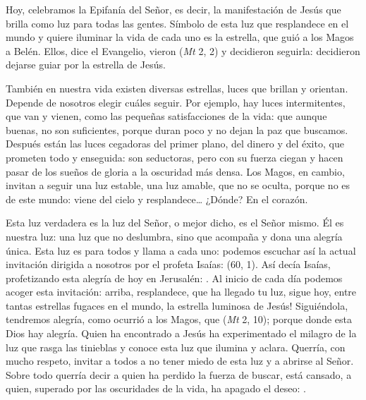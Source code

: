 Hoy, celebramos la Epifanía del Señor, es decir, la manifestación de Jesús que brilla como luz para todas las gentes. Símbolo de esta luz que resplandece en el mundo y quiere iluminar la vida de cada uno es la estrella, que guió a los Magos a Belén. Ellos, dice el Evangelio, vieron  (\emph{Mt} 2, 2) y decidieron seguirla: decidieron dejarse guiar por la estrella de Jesús.

También en nuestra vida existen diversas estrellas, luces que brillan y orientan. Depende de nosotros elegir cuáles seguir. Por ejemplo, hay luces intermitentes, que van y vienen, como las pequeñas satisfacciones de la vida: que aunque buenas, no son suficientes, porque duran poco y no dejan la paz que buscamos. Después están las luces cegadoras del primer plano, del dinero y del éxito, que prometen todo y enseguida: son seductoras, pero con su fuerza ciegan y hacen pasar de los sueños de gloria a la oscuridad más densa. Los Magos, en cambio, invitan a seguir una luz estable, una luz amable, que no se oculta, porque no es de este mundo: viene del cielo y resplandece\ldots{} ¿Dónde? En el corazón.

Esta luz verdadera es la luz del Señor, o mejor dicho, es el Señor mismo. Él es nuestra luz: una luz que no deslumbra, sino que acompaña y dona una alegría única. Esta luz es para todos y llama a cada uno: podemos escuchar así la actual invitación dirigida a nosotros por el profeta Isaías:  (60, 1). Así decía Isaías, profetizando esta alegría de hoy en Jerusalén: . Al inicio de cada día podemos acoger esta invitación: arriba, resplandece, que ha llegado tu luz, sigue hoy, entre tantas estrellas fugaces en el mundo, la estrella luminosa de Jesús! Siguiéndola, tendremos alegría, como ocurrió a los Magos, que  (\emph{Mt} 2, 10); porque donde esta Dios hay alegría. Quien ha encontrado a Jesús ha experimentado el milagro de la luz que rasga las tinieblas y conoce esta luz que ilumina y aclara. Querría, con mucho respeto, invitar a todos a no tener miedo de esta luz y a abrirse al Señor. Sobre todo querría decir a quien ha perdido la fuerza de buscar, está cansado, a quien, superado por las oscuridades de la vida, ha apagado el deseo: .

